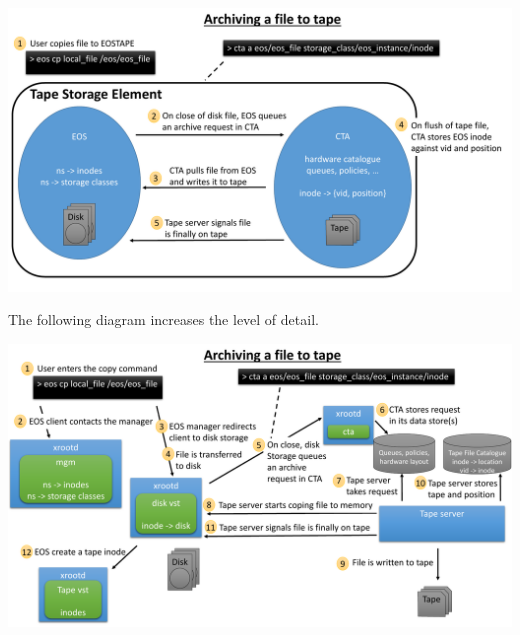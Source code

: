 \documentclass{article}
\begin{document}
\includegraphics[width=\linewidth]{EOSTAPE_high_level_archive}

The following diagram increases the level of detail.

\includegraphics[width=\linewidth]{EOSTAPE_simple_archive}

\newpage
\end{document}
